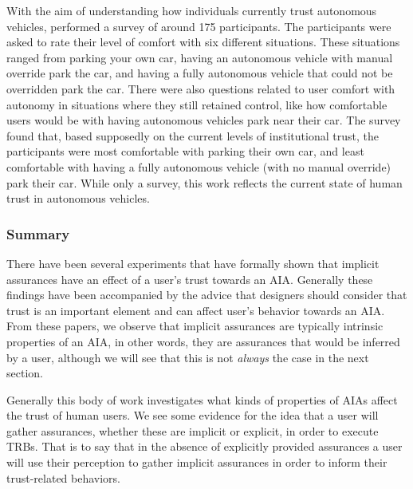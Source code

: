 With the aim of understanding how individuals currently trust autonomous vehicles, \citet{Munjal_Desai2009-en} performed a survey of around 175 participants. The participants were asked to rate their level of comfort with six different situations. These situations ranged from parking your own car, having an autonomous vehicle with manual override park the car, and having a fully autonomous vehicle that could not be overridden park the car. There were also questions related to user comfort with autonomy in situations where they still retained control, like how comfortable users would be with having autonomous vehicles park near their car.  The survey found that, based supposedly on the current levels of institutional trust, the participants were most comfortable with parking their own car, and least comfortable with having a fully autonomous vehicle (with no manual override) park their car. While only a survey, this work reflects the current state of human trust in autonomous vehicles. 

\subsubsection{Summary}
There have been several experiments that have formally shown that implicit assurances have an effect of a user's trust towards an AIA. Generally these findings have been accompanied by the advice that designers should consider that trust is an important element and can affect user's behavior towards an AIA. From these papers, we observe that implicit assurances are typically intrinsic properties of an AIA, in other words, they are assurances that would be inferred by a user, although we will see that this is not \emph{always} the case in the next section. 

Generally this body of work investigates what kinds of properties of AIAs affect the trust of human users. We see some evidence for the idea that a user will gather assurances, whether these are implicit or explicit, in order to execute TRBs. That is to say that in the absence of explicitly provided assurances a user will use their perception to gather implicit assurances in order to inform their trust-related behaviors.


